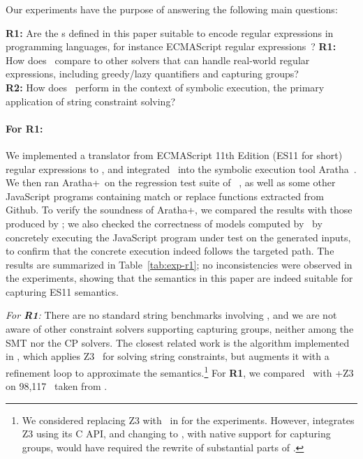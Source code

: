 Our experiments have the purpose of answering the following main questions:

\smallskip
\OMIT
{
\textbf{R1:} Are the  {\regexp}s defined in this paper
suitable to encode regular expressions in programming languages,
for instance ECMAScript regular expressions~\cite{ECMAScript11}?
}
\noindent
\textbf{R1:} How does \ostrich\ compare to other solvers that can
handle real-world regular expressions, including greedy/lazy
quantifiers and capturing groups?
\\
\textbf{R2:} How does \ostrich\ perform in the context of symbolic execution,
the primary application of string constraint solving?

%
\OMIT
{
\paragraph{For \textbf{R1}:} We implemented a translator from ECMAScript 11th Edition (ES11 for short) regular
expressions to \regexps, and integrated \ostrich\ into the symbolic
execution tool Aratha~\cite{aratha}. We then ran Aratha+\ostrich\ on
the regression test suite of \expose{}~\cite{DBLP:conf/spin/LoringMK17},
as well as some other JavaScript programs containing match or replace
functions extracted from Github. To verify the soundness of
Aratha+\ostrich, we compared the results with those produced by
\expose{}; we also checked the correctness of models computed by
\ostrich\ by concretely executing the JavaScript program under test on
the generated inputs, to confirm that the concrete execution indeed
follows the targeted path. The results are summarized in Table~\ref{tab:exp-r1};
no inconsistencies were observed in the experiments, showing that the
semantics in this paper are indeed suitable for capturing ES11
semantics.
}
\smallskip
{\em For \textbf{R1}:} There are no standard string benchmarks
involving \regexps, and we are not aware of other constraint solvers
supporting capturing groups, neither among the SMT nor the CP
solvers. %
The closest related work is the algorithm implemented in \expose{}, which
applies Z3~\cite{Z3} for solving string constraints, but augments
it with a refinement loop to approximate the {\regexp}
semantics.\footnote{We considered replacing Z3 with \ostrich\ in
  \expose{} for the experiments. However, \expose{} integrates Z3 using its
  C API, and changing to \ostrich, with native support
  for capturing groups, would have required the rewrite of substantial
  parts of \expose{}.}
%
For \textbf{R1}, we compared \ostrich\ with \expose{}+Z3 on 98,117
\regexps\ taken from \cite{DMC+19}.

